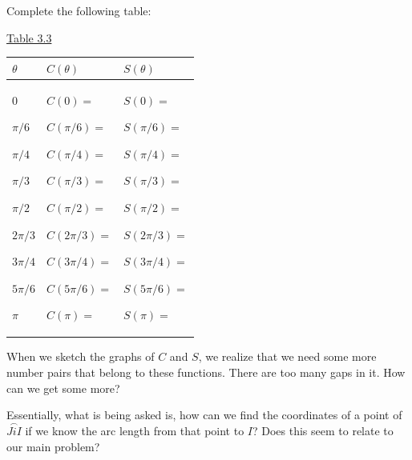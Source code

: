 \documentclass[english]{book}
\newcommand{\arc}[1]{\overset{\frown}{#1} }
\begin{document}
Complete the following table:

\begin{center}
\underline{Table 3.3}
\end{center}

\begin{table}[htbp]
\begin{center}
\begin{tabular}{|p{30pt}|p{70pt}|p{70pt}|}
\hline 
$\theta$ & $C(\theta)$ & $S(\theta)$ \\
\hline 
$0$ \par $\pi/6$ \par $\pi/4$ \par $\pi/3$ \par $\pi/2$ \par $2\pi/3$ \par $3\pi/4$ \par $5\pi/6$ \par $\pi$ 
& $C(0)=$ \par $C(\pi/6)=$ \par $C(\pi/4)=$ \par $C(\pi/3)=$ \par $C(\pi/2)=$ \par $C(2\pi/3)=$ \par $C(3\pi/4)=$ \par $C(5\pi/6)=$ \par $C(\pi)=$
& $S(0)=$ \par $S(\pi/6)=$ \par $S(\pi/4)=$ \par $S(\pi/3)=$ \par $S(\pi/2)=$ \par $S(2\pi/3)=$ \par $S(3\pi/4)=$ \par $S(5\pi/6)=$ \par $S(\pi)=$ \\
\hline
\end{tabular}
\label{tbl3.3}
\end{center}
\end{table}

When we sketch the graphs of $C$ and $S$, we realize that we need some more number pairs that belong to these functions. There are too many gaps in it. How can we get some more? 

\vfill

Essentially, what is being asked is, how can we find the coordinates of a point of $\arc{JiI}$ if we know the arc length from that point to $I$? Does this seem to relate to our main problem? 
\end{document}
